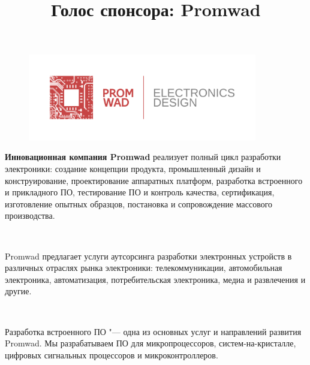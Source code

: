 \documentclass[10pt, a5paper]{article}
\begin{document}
\title{Голос спонсора: Promwad}
\date{}
\maketitle

\begin{figure}[h!]
\centering
\includegraphics[width=10cm]{53_spons_promwad.png}
\end{figure}

{\bf Инновационная компания Promwad} реализует полный цикл разработки электроники: создание концепции продукта, промышленный дизайн и конструирование, проектирование аппаратных \linebreak платформ, разработка встроенного и прикладного ПО, тестирование ПО и контроль качества, сертификация, изготовление опытных образцов, постановка и сопровождение массового производства.

~

Promwad предлагает услуги аутсорсинга разработки электронных устройств в различных отраслях рынка электроники: телекоммуникации, автомобильная электроника, автоматизация, потребительская электроника, медиа и развлечения и другие. 

~

Разработка встроенного ПО "--- одна из основных услуг и направлений развития Promwad. Мы разрабатываем ПО для микропроцессоров, систем-на-кристалле, цифровых сигнальных процессоров и микроконтроллеров.
\end{document}
